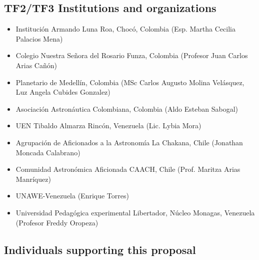 \documentclass[12pt]{article}
\begin{document}
\subsection*{TF2/TF3 Institutions and organizations }
\begin{itemize}
\item Institución Armando Luna Roa, Chocó, Colombia (Esp. Martha
  Cecilia Palacios Mena) 
\item Colegio Nuestra Señora del Rosario Funza, Colombia (Profesor
  Juan Carlos Arias Cañón) 
\item Planetario de Medellín, Colombia (MSc Carlos Augusto Molina
  Velásquez, Luz Angela Cubides Gonzalez) 
\item Asociación Astronáutica Colombiana, Colombia (Aldo Esteban
  Sabogal) 
\item UEN Tibaldo Almarza Rincón, Venezuela (Lic. Lybia Mora) 
\item Agrupación de Aficionados a la Astronomía La Chakana, Chile
  (Jonathan Moncada Calabrano) 
\item Comunidad Astronómica Aficionada CAACH, Chile (Prof. Maritza
  Arias Manríquez) 
\item UNAWE-Venezuela (Enrique Torres) 
\item Universidad Pedagógica experimental Libertador, Núcleo Monagas,
  Venezuela (Profesor Freddy Oropeza) 
\end{itemize}

\subsection*{Individuals supporting this proposal}
\end{document}

